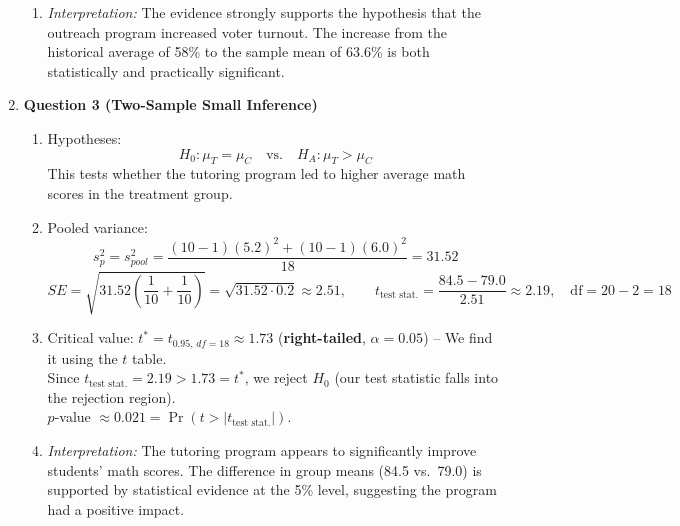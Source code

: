 \documentclass{article}
\begin{document}
\begin{enumerate}
\begin{enumerate}[label=(\alph*)]
    \item \textit{Interpretation:} The evidence strongly supports the hypothesis that the outreach program increased voter turnout. The increase from the historical average of 58\% to the sample mean of 63.6\% is both statistically and practically significant.
  \end{enumerate}

  \item \textbf{Question 3 (Two-Sample Small Inference)}
  \begin{enumerate}[label=(\alph*)]
    \item Hypotheses:
    \[
    H_0: \mu_T = \mu_C \quad\text{vs.}\quad H_A: \mu_T > \mu_C
    \]
    This tests whether the tutoring program led to higher average math scores in the treatment group.

    \item Pooled variance:
    \[
    s_p^2 = s_{pool}^2 = \frac{(10-1)(5.2)^2 + (10-1)(6.0)^2}{18} = 31.52
    \]
    \[
    SE = \sqrt{31.52\left(\frac{1}{10} + \frac{1}{10}\right)} = \sqrt{31.52 \cdot 0.2} \approx 2.51,\qquad
    t_{\text{test stat.}} = \frac{84.5 - 79.0}{2.51} \approx 2.19,\quad \text{df} = 20-2=18
    \]

    \item Critical value: $t^* = t_{0.95,\,df=18} \approx 1.73$ (\textbf{right-tailed}, $\alpha = 0.05$) -- We find it using the $t$ table. \\
    Since $t_{\text{test stat.}} = 2.19 > 1.73=t^*$, we reject $H_0$ (our test statistic falls into the rejection region). \\
    $p$-value $\approx 0.021 = \Pr(t > |t_{\text{test stat.}}|)$.

    \item \textit{Interpretation:} The tutoring program appears to significantly improve students' math scores. The difference in group means (84.5 vs.\ 79.0) is supported by statistical evidence at the 5\% level, suggesting the program had a positive impact.
  \end{enumerate}

\end{enumerate}
\end{document}

